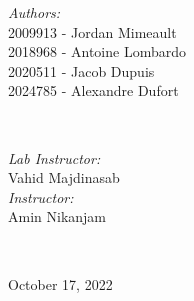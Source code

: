 \begin{titlepage}
\begin{minipage}{0.4\textwidth}
\begin{flushleft} \large
\emph{Authors:}\\
2009913 - Jordan Mimeault\\
2018968 - Antoine Lombardo\\
2020511 - Jacob Dupuis\\
2024785 - Alexandre Dufort\\[1.2em]
\end{flushleft}
\end{minipage}
~
\begin{minipage}{0.4\textwidth}
\begin{flushright} \large
\emph{Lab Instructor:} \\
Vahid Majdinasab  \\[1.2em] %
\emph{Instructor:} \\
Amin Nikanjam %
\end{flushright}
\end{minipage}\\[2cm]
\makeatother



{\large October 17, 2022}\\[2cm] %

\vfill %

\end{titlepage}